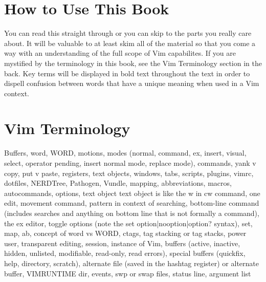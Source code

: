 \documentclass[12pt]{book}
\begin{document}
\section{How to Use This Book}
You can read this straight through or you can skip to the parts you really care about.
It will be valuable to at least skim all of the material so that you come a way with an understanding of the full scope of Vim capabilites.
If you are mystified by the terminology in this book, see the Vim Terminology section in the back.
Key terms will be displayed in bold text throughout the text in order to dispell confusion between words that have a unique meaning when used in a Vim context.

\section{Vim Terminology}
Buffers, word, WORD, motions, modes (normal, command, ex, insert, visual, select, operator pending, insert normal mode, replace mode), commands, yank v copy, put v paste, registers, text objects, windows, tabs, scripts, plugins, vimrc, dotfiles,
NERDTree, Pathogen, Vundle, mapping, abbreviations, macros, autocommands, options, text object text object is like the w in cw command, one edit, movement command, pattern in context of
searching, bottom-line command (includes searches and anything on bottom line that is not formally a command), the ex editor, toggle options (note the set option|nooption|option? syntax),
set, map, ab, concept of word vs WORD, ctags, tag stacking or tag stacks, power user, transparent editing, session, instance of Vim, buffers (active, inactive, hidden, unlisted, modifiable, read-only,
read errors), special buffers (quickfix, help, directory, scratch), alternate file (saved in the hashtag register) or alternate buffer, VIMRUNTIME dir, events, swp or swap files, status line,
argument list
\end{document}
